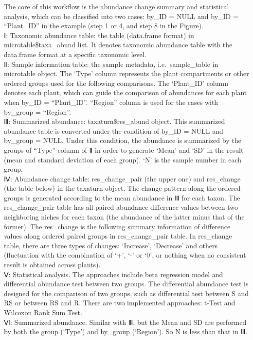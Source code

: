 \documentclass[
]{book}
\begin{document}
The core of this workflow is the abundance change summary and statistical analysis,
which can be classified into two cases: by\_ID = NULL and by\_ID = ``Plant\_ID'' in the example (step 1 or 4, and step 8 in the Figure).\\
Ⅰ: Taxonomic abundance table: the table (data.frame format) in microtable\$taxa\_abund list.
It denotes taxonomic abundance table with the data.frame format at a specific taxonomic level.\\
Ⅱ: Sample information table: the sample metadata, i.e.~sample\_table in microtable object.
The `Type' column represents the plant compartments or other ordered groups used for the following comparisons.
The `Plant\_ID' column denotes each plant, which can guide the comparison of abundances for each plant when by\_ID = ``Plant\_ID''.
``Region'' column is used for the cases with by\_group = ``Region''.\\
Ⅲ: Summarized abundance: taxaturn\$res\_abund object.
This summarized abundance table is converted under the condition of by\_ID = NULL and by\_group = NULL.
Under this condition, the abundance is summarized by the groups of ``Type'' column of Ⅱ in order to generate `Mean' and `SD' in the result (mean and standard deviation of each group).
`N' is the sample number in each group.\\
Ⅳ: Abundance change table: res\_change\_pair (the upper one) and res\_change (the table below) in the taxaturn object.
The change pattern along the ordered groups is generated according to the mean abundance in Ⅲ for each taxon.
The res\_change\_pair table has all paired abundance difference values between two neighboring niches for each taxon (the abundance of the latter minus that of the former).
The res\_change is the following summary information of difference values along ordered paired groups in res\_change\_pair table.
In res\_change table, there are three types of changes: `Increase', `Decrease' and others (fluctuation with the combination of `+', `-' or `0',
or nothing when no consistent result is obtained across plants).\\
Ⅴ: Statistical analysis.
The approaches include beta regression model and differential abundance test between two groups.
The differential abundance test is designed for the comparison of two groups,
such as differential test between S and RS or between RS and R.
There are two implemented approaches: t-Test and Wilcoxon Rank Sum Test.\\
Ⅵ: Summarized abundance. Similar with Ⅲ, but the Mean and SD are performed by both the group (`Type') and by\_group (`Region'). So N is less than that in Ⅲ.\\
\end{document}
